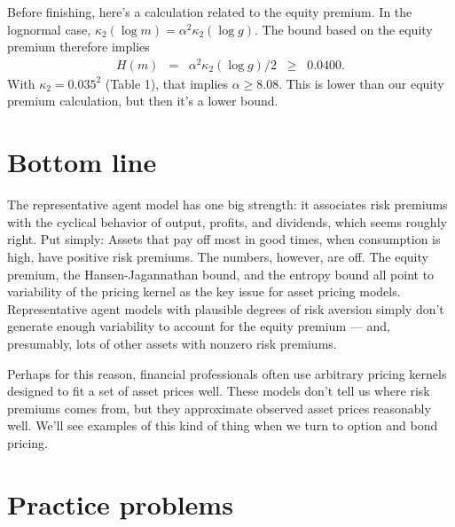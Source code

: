 \documentclass[11pt]{article}
\begin{document}
Before finishing, here's a calculation related to the equity premium.
In the lognormal case,
$\kappa_2(\log m) = \alpha^2 \kappa_2(\log g)$.
The bound based on the equity premium therefore implies
\begin{eqnarray*}
    H(m) &=& \alpha^2 \kappa_2(\log g)/2 \;\;\geq\;\; 0.0400 .
\end{eqnarray*}
With $\kappa_2 = 0.035^2 $ (Table 1),
that implies $\alpha \geq 8.08$.
This is lower than our equity premium calculation,
but then it's a lower bound.


%
%


\section*{Bottom line}

The representative agent model has one big strength:
it associates risk premiums with the cyclical behavior
of output, profits, and dividends, which seems roughly right.
Put simply: Assets that pay off most in good times, when consumption is high,
have positive risk premiums.
The numbers, however, are off.
The equity premium, the Hansen-Jagannathan bound, and the entropy bound
all point to variability of the pricing kernel as the key issue for asset pricing models.
Representative agent models with plausible degrees of risk aversion simply don't generate
enough variability to account for the equity premium --- and, presumably,
lots of other assets with nonzero risk premiums.

Perhaps for this reason, financial professionals often
use arbitrary pricing kernels designed to fit a set
of asset prices well.
These models don't tell us where risk premiums comes from,
but they approximate observed asset prices reasonably well.
We'll see examples of this kind of thing when we turn to option and bond pricing.


\section*{Practice problems}
\end{document}
